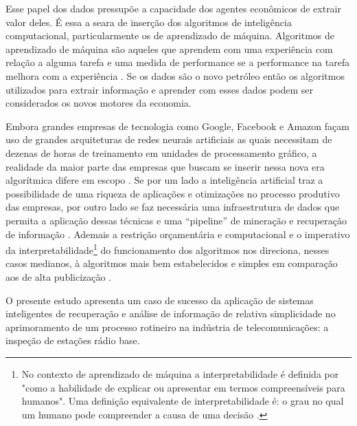 \documentclass[
	12pt,				%
	openany,			%
	oneside,			%
	a4paper,			%
	english,			%
	french,				%
	spanish,			%
	brazil,				%
	]{abntex2}
\begin{document}
Esse papel dos dados pressupõe a capacidade dos agentes econômicos de extrair
valor deles. É essa a seara de inserção dos algoritmos de inteligência
computacional, particularmente os de aprendizado de máquina. Algoritmos de
aprendizado de máquina são aqueles que aprendem com uma experiência com relação
a alguma tarefa e uma medida de performance se a performance na tarefa melhora
com a experiência \cite{carbonell1984machine}. Se os dados são o novo petróleo
então os algoritmos utilizados para extrair informação e aprender com esses
dados podem ser considerados os novos motores da economia.

Embora grandes empresas de tecnologia como Google, Facebook e Amazon façam uso
de grandes arquiteturas de redes neurais artificiais as quais necessitam de
dezenas de horas de treinamento em unidades de processamento gráfico, a
realidade da maior parte das empresas que buscam se inserir nessa nova era
algorítmica difere em escopo \cite{canziani2016analysis}. Se por um lado a
inteligência artificial traz a possibilidade de uma riqueza de aplicações e
otimizações no processo produtivo das empresas, por outro lado se faz necessária
uma infraestrutura de dados que permita a aplicação dessas técnicas e uma
``pipeline'' de mineração e recuperação de informação
\cite{schutze2007introduction}. Ademais a restrição orçamentária e computacional
e o imperativo da interpretabilidade\footnote{No contexto de aprendizado de
  máquina a interpretabilidade é definida por 
  "como a habilidade de explicar ou apresentar em termos compreensíveis para
  humanos". Uma definição equivalente de interpretabilidade é: o grau no qual um
  humano pode compreender a causa de uma decisão \cite{miller2018explanation}.}
do funcionamento dos algoritmos nos direciona, nesses casos medianos, à
algoritmos mais bem estabelecidos e simples em comparação aos de alta
publicização \cite{dreiseitl2002logistic}.

O presente estudo apresenta um caso de sucesso da aplicação de sistemas
inteligentes de recuperação e análise de informação de relativa simplicidade no
aprimoramento de um processo rotineiro na indústria de telecomunicações: a
inspeção de estações rádio base.
\end{document}
